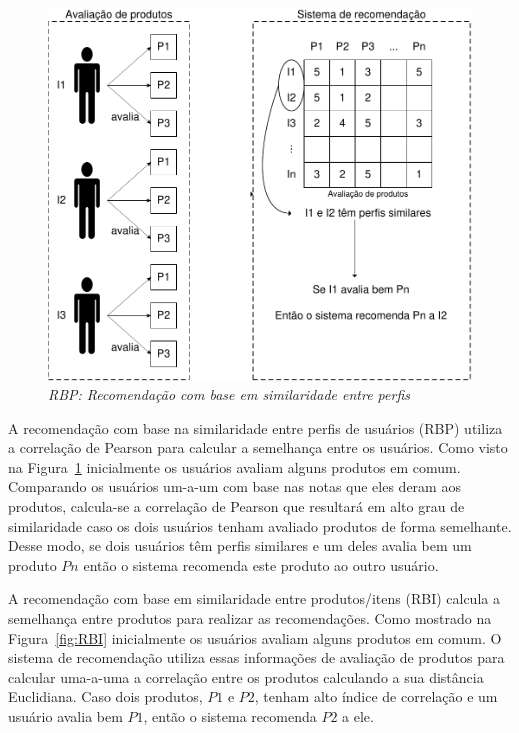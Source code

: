 \begin{figure}
  \centering
  \includegraphics[width=\textwidth]{imagens/RBP}
  \caption{\it RBP: Recomendação com base em similaridade entre perfis}
  \label{fig:RBP}
\end{figure}

 A recomendação com base na similaridade entre perfis de usuários (RBP) utiliza a correlação de Pearson para calcular a semelhança entre os usuários. Como visto na Figura~\ref{fig:RBP} inicialmente os usuários avaliam alguns produtos em comum. Comparando os usuários um-a-um com base nas notas que eles deram aos produtos, calcula-se a correlação de Pearson que resultará em alto grau de similaridade caso os dois usuários tenham avaliado produtos de forma semelhante. Desse modo, se dois usuários têm perfis similares e um deles avalia bem um produto $P{n}$ então o sistema recomenda este produto ao outro usuário.

 A recomendação com base em similaridade entre produtos/itens (RBI) calcula a semelhança entre produtos para realizar as recomendações. Como mostrado na Figura~\ref{fig:RBI} inicialmente os usuários avaliam alguns produtos em comum. O sistema de recomendação utiliza essas informações de avaliação de produtos para calcular uma-a-uma a correlação entre os produtos calculando a sua distância Euclidiana. Caso dois produtos, $P{1}$ e $P{2}$, tenham alto índice de correlação e um usuário avalia bem $P{1}$, então o sistema recomenda $P{2}$ a ele.

